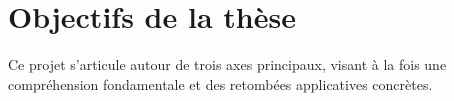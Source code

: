 \documentclass[12pt, a4paper]{article}
\begin{document}
\section{Objectifs de la thèse}

Ce projet s'articule autour de trois axes principaux, visant à la fois une compréhension fondamentale et des retombées applicatives concrètes.

%
%
%
%
%
\end{document}
